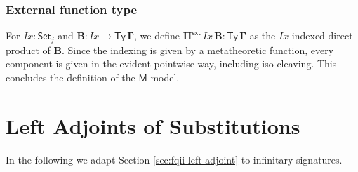 \documentclass[12pt,a4paper,twoside,openany]{book}
\theoremstyle{remark}
\theoremstyle{definition}
\theoremstyle{theorem}
\newcommand{\mi}[1]{\mathit{#1}}
\newcommand{\bs}[1]{\boldsymbol{#1}}
\newcommand{\Ty}{\mathsf{Ty}}
\newcommand{\ra}{\rightarrow}
\newcommand{\Set}{\mathsf{Set}}
\newcommand{\Pie}{\Pi^{\mathsf{ext}}}
\newcommand{\bTy}{\bs{\Ty}}
\newcommand{\bGamma}{\bs{\Gamma}}
\newcommand{\bB}{\bs{B}}
\newcommand{\bPie}{\bs{\Pie}}
\newcommand{\bM}{\bs{\mathsf{M}}}
\begin{document}
\subsubsection{External function type}

For $\mi{Ix} : \Set_j$ and $\bB : \mi{Ix} \ra \bTy\,\bGamma$, we define
$\bPie\,\mi{Ix}\,\bB \bs{:} \bTy\,\bGamma$ as the $\mi{Ix}$-indexed direct
product of $\bB$. Since the indexing is given by a metatheoretic function, every
component is given in the evident pointwise way, including iso-cleaving. This
concludes the definition of the $\bM$ model.

\section{Left Adjoints of Substitutions}
\label{sec:iqii-left-adjoints}

In the following we adapt Section \ref{sec:fqii-left-adjoint} to infinitary
signatures.
\end{document}
